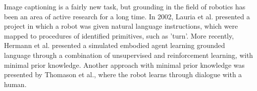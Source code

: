 \documentclass{article}
\begin{document}
Image captioning is a fairly new task, but grounding in the field of robotics has been an area of active research for a long time. In 2002, Lauria et al. presented a project in which a robot was given natural language instructions, which were mapped to procedures of identified primitives, such as 'turn'\cite{lauria2002}. More recently, Hermann et al. presented a simulated embodied agent learning grounded language through a combination of unsupervised and reinforcement learning, with minimal prior knowledge\cite{hermann2017grounded}. Another approach with minimal prior knowledge was presented by Thomason et al., where the robot learns through dialogue with a human\cite{thomason2019grounded}.


%
%
%
\end{document}
